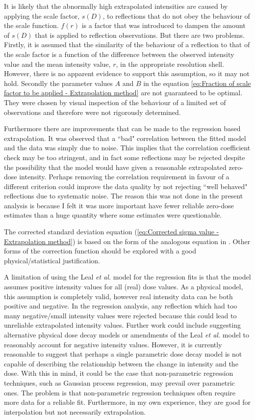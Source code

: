 It is likely that the abnormally high extrapolated intensities are caused by applying the scale factor, $s(D)$, to reflections that do not obey the behaviour of the scale function.
$f(r)$ is a factor that was introduced to dampen the amount of $s(D)$ that is applied to reflection observations.
But there are two problems.
Firstly, it is assumed that the similarity of the behaviour of a reflection to that of the scale factor is a function of the difference between the observed intensity value and the mean intensity value, $r$, in the appropriate resolution shell.
However, there is no apparent evidence to support this assumption, so it may not hold.
Secondly the parameter values $A$ and $B$ in the equation \ref{eq:Fraction of scale factor to be applied - Extrapolation method} are not guaranteed to be optimal.
They were chosen by visual inspection of the behaviour of a limited set of observations and therefore were not rigorously determined.

Furthermore there are improvements that can be made to the regression based extrapolation.
It was observed that a ``bad" correlation between the fitted model and the data was simply due to noise.
This implies that the correlation coefficient check may be too stringent, and in fact some reflections may be rejected despite the possibility that the model would have given a reasonable extrapolated zero-dose intensity.
Perhaps removing the correlation requirement in favour of a different criterion could improve the data quality by not rejecting ``well behaved" reflections due to systematic noise.
The reason this was not done in the present analysis is because I felt it was more important have fewer reliable zero-dose estimates than a huge quantity where some estimates were questionable.

The corrected standard deviation equation (\ref{eq:Corrected sigma value - Extrapolation method}) is based on the form of the analogous equation in \cite{diederichs2003}.
Other forms of the correction function should be explored with a good physical/statistical justification.

A limitation of using the Leal \textit{et al.} model for the regression fits is that the model assumes positive intensity values for all (real) dose values.
As a physical model, this assumption is completely valid, however real intensity data can be both positive and negative.
In the regression analysis, any reflection which had too many negative/small intensity values were rejected because this could lead to unreliable extrapolated intensity values.
Further work could include suggesting alternative physical dose decay models or amendments of the Leal \textit{et al.} model to reasonably account for negative intensity values.
However, it is currently reasonable to suggest that perhaps a single parametric dose decay model is not capable of describing the relationship between the change in intensity and the dose.
With this in mind, it could be the case that non-parametric regression techniques, such as Gaussian process regression, may prevail over parametric ones.
The problem is that non-parametric regression techniques often require more data for a reliable fit.
Furthermore, in my own experience, they are good for interpolation but not necessarily extrapolation.

